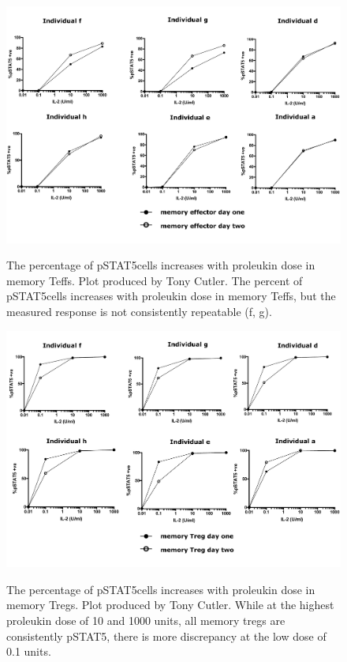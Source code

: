 \begin{figure}
\centering
\begin{minipage}{.65\textwidth}
\includegraphics[width=\linewidth]{figures/tony-memory-eff}
\end{minipage}
\begin{minipage}{\textwidth}
{ The percentage of pSTAT5\positive cells increases with proleukin dose in memory Teffs.  }
{
    Plot produced by Tony Cutler.
    The percent of pSTAT5\positive cells increases with proleukin dose in memory Teffs, but the measured response is not consistently repeatable (f, g).
}
\end{minipage}
\begin{minipage}{.65\textwidth}
\includegraphics[width=\linewidth]{figures/tony-memory-treg}
\end{minipage}
\begin{minipage}{\textwidth}
{ The percentage of pSTAT5\positive cells increases with proleukin dose in memory Tregs. }
{
  Plot produced by Tony Cutler.
  While at the highest proleukin dose of 10 and 1000 units, all memory tregs are consistently pSTAT5\positive,
  there is more discrepancy at the low dose of 0.1 units.
}
\end{minipage}
\end{figure}



